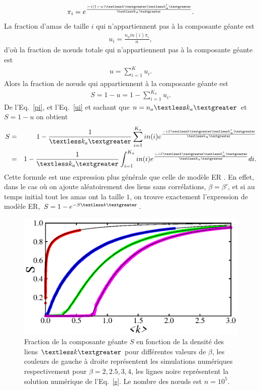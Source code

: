 \begin{eqnarray}
\pi_{i}=e^{\frac{-i(1-u)\km\kmap}{\kma}}.
\label{pi}
\end{eqnarray}
La fraction d'amas de taille $i$ qui n'appartiennent pas à la composante géante  est 
\begin{eqnarray}
u_{i}=\frac{n_ain(i)\pi_i}{n},
\label{ui}
\end{eqnarray}
d'où la fraction de nœuds totale qui  n'appartiennent pas  à la composante géante est
\begin{eqnarray}
u=\sum_{i=1}^K u_i.
\end{eqnarray}
Alors la fraction de nœuds qui appartiennent à la composante géante est 
\begin{eqnarray}
S=1-u=1-\sum_{i=1}^{K_a} u_i.
\end{eqnarray}
De l'Eq.~\eqref{pi}, et l'Eq.~\eqref{ui} et sachant que $n=n_a\kma$ et $S=1-u$ on obtient
\begin{eqnarray}
S&=&1-\frac{1}{\kma}\sum_{i=1}^{K_a}in(i)e^{\frac{-iS\km\kmap}{\kma}}\nonumber \\
&=& 1-\frac{1}{\kma}\int_{i=1}^{K_a}in(i)e^{\frac{-iS\km\kmap}{\kma}}di.
\label{s}
\end{eqnarray}
Cette formule est une expression plus générale que celle de modèle ER \cite{Erdos-Renyi1959}. En effet, dans le cas où on ajoute aléatoirement des liens sans corrélations, $\beta=\beta'$, et si au temps initial tout les amas ont la taille $1$, on trouve exactement l'expression de modèle ER, $S=1-e^{-S\km}$.
\begin{figure}[h!]
	\centering
	\includegraphics[scale=1.2]{./figures/fig-CG}
	\caption{Fraction de la composante géante $S$ en fonction de la densité des liens $\km$ pour différentes valeurs de $\beta$, les couleurs de gauche à droite représentent les simulations numériques respectivement pour $\beta=2,2.5,3,4$, les lignes noire représentent la solution numérique de l'Eq.~\eqref{s}. Le nombre des nœuds est $n=10^5$.}
	\label{CG}
\end{figure}

